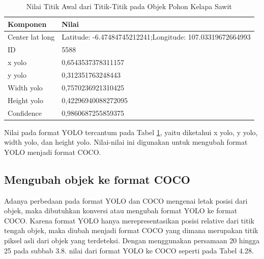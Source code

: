 \begin{singlespace}
	\begin{table}[H]
		\centering
		\caption{Nilai Titik Awal dari Titik-Titik pada Objek Pohon Kelapa Sawit}
		\label{tbl:Nilai-Titik-Awal-dari-Titik-Titik-Pada-Objek-Pohon-Kelapa-Sawit}
		\begin{tabular}{|m{2cm}|m{8cm}|}
			\hline
			\rowcolor[HTML]{D9D9D9} 
			Komponen        & Nilai                                                     \\ \hline
			Center lat long & Latitude: -6.47484745212241;Longitude: 107.03319672664993 \\ \hline
			ID              & 5588                                                      \\ \hline
			x yolo          & 0,6543537378311157                                        \\ \hline
			y yolo          & 0,312351763248443                                         \\ \hline
			Width yolo      & 0,7570236921310425                                        \\ \hline
			Height yolo     & 0,42296940088272095                                       \\ \hline
			Confidence      & 0,9860687255859375                                        \\ \hline
		\end{tabular}
	\end{table}
\end{singlespace}

Nilai pada format YOLO tercantum pada Tabel \ref{tbl:Nilai-Titik-Awal-dari-Titik-Titik-Pada-Objek-Pohon-Kelapa-Sawit}, yaitu diketahui x yolo, y yolo, width yolo, dan height yolo. Nilai-nilai ini digunakan untuk mengubah format YOLO menjadi format COCO.

\subsection{Mengubah objek ke format COCO}
\hspace{1,2cm}
Adanya perbedaan pada format YOLO dan COCO mengenai letak posisi dari objek, maka dibutuhkan konversi atau mengubah format YOLO ke format COCO. Karena format YOLO hanya merepresentasikan posisi relative dari titik tengah objek, maka diubah menjadi format COCO yang dimana merupakan titik piksel asli dari objek yang terdeteksi. Dengan menggunakan persamaan 20 hingga 25 pada subbab 3.8. nilai dari format YOLO ke COCO seperti pada Tabel 4.28.

